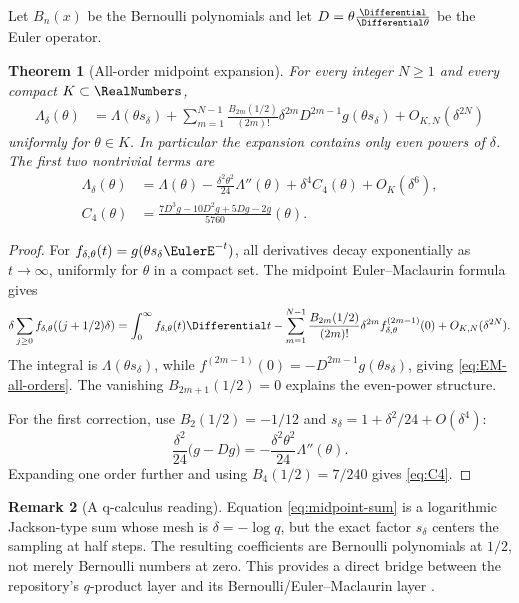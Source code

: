 \documentclass[11pt,a4paper]{article}
\newtheorem{theorem}{Theorem}[section]
\theoremstyle{definition}
\newtheorem{remark}[theorem]{Remark}
\begin{document}
Let $B_n(x)$ be the Bernoulli polynomials and let
$D=\theta\frac{\Differential}{\Differential\theta}$ be the Euler operator.

\begin{theorem}[All-order midpoint expansion]
\label{thm:midpoint-EM}
For every integer $N\ge1$ and every compact $K\subset\RealNumbers$,
\begin{align}
 \Lambda_\delta(\theta)
 &=\Lambda(\theta s_\delta)
 +\sum_{m=1}^{N-1}
   \frac{B_{2m}(1/2)}{(2m)!}\delta^{2m}
   D^{2m-1}g(\theta s_\delta)
 +O_{K,N}(\delta^{2N})
 \label{eq:EM-all-orders}
\end{align}
uniformly for $\theta\in K$.  In particular the expansion contains only
even powers of $\delta$.  The first two nontrivial terms are
\begin{align}
 \Lambda_\delta(\theta)
 &=\Lambda(\theta)
 -\frac{\delta^2\theta^2}{24}\Lambda''(\theta)
 +\delta^4 C_4(\theta)+O_K(\delta^6),
 \label{eq:Lambda-two-corrections}\\
 C_4(\theta)
 &=\frac{7D^3g-10D^2g+5Dg-2g}{5760}(\theta).
 \label{eq:C4}
\end{align}
\end{theorem}

\begin{proof}
For
$f_{\delta,\theta}(t)=g(\theta s_\delta \EulerE^{-t})$, all derivatives decay
exponentially as $t\to\infty$, uniformly for $\theta$ in a compact set.
The midpoint Euler--Maclaurin formula \cite{Olver} gives
\begin{equation}
 \delta\sum_{j\ge0}f_{\delta,\theta}((j+1/2)\delta)
 =\int_0^\infty f_{\delta,\theta}(t)\Differential t
 -\sum_{m=1}^{N-1}
   \frac{B_{2m}(1/2)}{(2m)!}\delta^{2m}
   f_{\delta,\theta}^{(2m-1)}(0)
 +O_{K,N}(\delta^{2N}).
 \label{eq:midpoint-EM-proof}
\end{equation}
The integral is $\Lambda(\theta s_\delta)$, while
$f^{(2m-1)}(0)=-D^{2m-1}g(\theta s_\delta)$, giving
\eqref{eq:EM-all-orders}.  The vanishing
$B_{2m+1}(1/2)=0$ explains the even-power structure.

For the first correction, use $B_2(1/2)=-1/12$ and
$s_\delta=1+\delta^2/24+O(\delta^4)$:
\[
 \frac{\delta^2}{24}\bigl(g-Dg\bigr)
 =-\frac{\delta^2\theta^2}{24}\Lambda''(\theta).
\]
Expanding one order further and using
$B_4(1/2)=7/240$ gives \eqref{eq:C4}.
\end{proof}

\begin{remark}[A q-calculus reading]
Equation \eqref{eq:midpoint-sum} is a logarithmic Jackson-type sum whose mesh
is $\delta=-\log q$, but the exact factor $s_\delta$ centers the sampling at
half steps.  The resulting coefficients are Bernoulli polynomials at
$1/2$, not merely Bernoulli numbers at zero.  This provides a direct bridge
between the repository's $q$-product layer and its Bernoulli/Euler--Maclaurin
layer \cite{GasperRahman}.
\end{remark}
\end{document}
